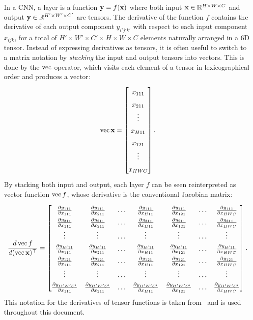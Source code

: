 In a CNN, a layer is a function $\mathbf{y} = f(\mathbf{x})$ where both input $\mathbf{x} \in \mathbb{R}^{H\times W \times C}$ and output $\mathbf{y} \in \mathbb{R}^{H'\times W' \times C'}$ are tensors. The derivative of the function $f$ contains the derivative of each output component $y_{i'j'k'}$ with respect to each input component $x_{ijk}$, for a total of $H'\times W'\times C'\times H\times W\times C$ elements naturally arranged in a 6D tensor. Instead of expressing derivatives as tensors, it is often useful  to switch to a matrix notation by \emph{stacking} the input and output tensors into vectors. This is done by the $\operatorname{vec}$ operator, which visits each element of a tensor in lexicographical order and produces a vector:
\[
  \vv \bx
  =
  \begin{bmatrix}
  x_{111} \\
  x_{211} \\
  \vdots
  \\
  x_{H11} \\
  x_{121} \\
  \vdots \\
  x_{HWC}  	
  \end{bmatrix}.
\]
By stacking both input and output, each layer $f$ can be seen reinterpreted as vector function $\operatorname{vec} f$, whose derivative is the conventional Jacobian matrix:
\[
\renewcommand*{\arraystretch}{1.5}
\frac{d \vv f}{d(\vv \bx)^\top}
=
\begin{bmatrix}
\frac{\partial y_{111}}{\partial x_{111}} & 
\frac{\partial y_{111}}{\partial x_{211}} &
\dots &
\frac{\partial y_{111}}{\partial x_{H11}} &
\frac{\partial y_{111}}{\partial x_{121}} &
\dots &
\frac{\partial y_{111}}{\partial x_{HWC}} \\
\frac{\partial y_{211}}{\partial x_{111}} & 
\frac{\partial y_{211}}{\partial x_{211}} &
\dots &
\frac{\partial y_{211}}{\partial x_{H11}} &
\frac{\partial y_{211}}{\partial x_{121}} &
\dots &
\frac{\partial y_{211}}{\partial x_{HWC}} \\
\vdots & \vdots & \dots & \vdots & \vdots & \dots & \vdots \\
\frac{\partial y_{H'11}}{\partial x_{111}} & 
\frac{\partial y_{H'11}}{\partial x_{211}} &
\dots &
\frac{\partial y_{H'11}}{\partial x_{H11}} &
\frac{\partial y_{H'11}}{\partial x_{121}} &
\dots &
\frac{\partial y_{H'11}}{\partial x_{HWC}} \\
\frac{\partial y_{121}}{\partial x_{111}} & 
\frac{\partial y_{121}}{\partial x_{211}} &
\dots &
\frac{\partial y_{121}}{\partial x_{H11}} &
\frac{\partial y_{121}}{\partial x_{121}} &
\dots &
\frac{\partial y_{121}}{\partial x_{HWC}} \\
\vdots & \vdots & \dots & \vdots & \vdots & \dots & \vdots \\
\frac{\partial y_{H'W'C'}}{\partial x_{111}} & 
\frac{\partial y_{H'W'C'}}{\partial x_{211}} &
\dots &
\frac{\partial y_{H'W'C'}}{\partial x_{H11}} &
\frac{\partial y_{H'W'C'}}{\partial x_{121}} &
\dots &
\frac{\partial y_{H'W'C'}}{\partial x_{HWC}}
\end{bmatrix}.
\]
This notation for the derivatives of tensor functions is taken from~\cite{kinghorn96integrals} and is used throughout this document.

